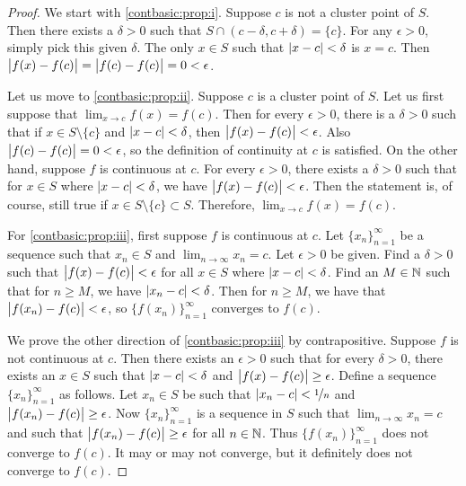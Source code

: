 \begin{proof}
\pagebreak[2]
We start with \ref{contbasic:prop:i}.  Suppose $c$ is not a cluster point of
$S$.  Then there exists a $\delta > 0$
such that $S \cap (c-\delta,c+\delta) = \{ c \}$.
For any $\epsilon > 0$, simply pick this given $\delta$.
The only $x \in S$ such that $\lvert {x-c} \rvert < \delta$ is $x=c$.  Then
$\bigl\lvert {f(x)-f(c)} \bigr\rvert = \bigl\lvert {f(c)-f(c)} \bigr\rvert = 0 < \epsilon$.

Let us move to \ref{contbasic:prop:ii}.
Suppose $c$ is a cluster point of $S$.  Let us first suppose
that $\lim_{x\to c} f(x) = f(c)$.  Then for every $\epsilon > 0$,
there is a $\delta > 0$ such that if $x \in S \setminus \{ c \}$
and $\lvert {x-c} \rvert < \delta$, then $\bigl\lvert {f(x)-f(c)} \bigr\rvert < \epsilon$.
Also $\bigl\lvert {f(c)-f(c)} \bigr\rvert = 0 < \epsilon$, so the definition of continuity at
$c$ is satisfied.  On the other hand, suppose $f$ is continuous
at $c$.  For every $\epsilon > 0$, there exists a $\delta > 0$
such that for $x \in S$ where $\lvert {x-c} \rvert < \delta$, we have
$\bigl\lvert {f(x)-f(c)} \bigr\rvert < \epsilon$.  Then the statement is, of course, still true if
$x \in S \setminus \{ c \} \subset S$.  Therefore, $\lim_{x\to c} f(x) =
f(c)$.

For \ref{contbasic:prop:iii}, first suppose $f$ is continuous at $c$.
Let $\{ x_n \}_{n=1}^\infty$
be a sequence such that $x_n \in S$ and $\lim_{n\to\infty} x_n = c$.  Let $\epsilon > 0$
be given.  Find a $\delta > 0$ such that $\bigl\lvert {f(x)-f(c)} \bigr\rvert < \epsilon$
for all $x \in S$ where $\lvert {x-c} \rvert < \delta$.  Find an $M \in {\mathbb{N}}$
such that for $n \geq M$, we have $\lvert {x_n-c} \rvert < \delta$.  Then for
$n \geq M$, we have that $\bigl\lvert {f(x_n)-f(c)} \bigr\rvert < \epsilon$,
so $\bigl\{ f(x_n) \bigr\}_{n=1}^\infty$
converges to $f(c)$.

We prove the other direction of \ref{contbasic:prop:iii} by contrapositive.
Suppose $f$ is not
continuous at $c$.  Then there exists an $\epsilon > 0$
such that for every $\delta > 0$, there exists an $x \in S$
such that $\lvert {x-c} \rvert < \delta$ and $\bigl\lvert {f(x)-f(c)} \bigr\rvert \geq \epsilon$.
Define a sequence $\{ x_n \}_{n=1}^\infty$ as follows.
Let $x_n \in S$ be such that $\lvert {x_n-c} \rvert < \nicefrac{1}{n}$
and $\bigl\lvert {f(x_n)-f(c)} \bigr\rvert \geq \epsilon$.
Now $\{ x_n \}_{n=1}^\infty$ is
a sequence in $S$ such that
$\lim_{n\to\infty} x_n = c$ and such that
$\bigl\lvert {f(x_n)-f(c)} \bigr\rvert \geq \epsilon$ for all $n \in {\mathbb{N}}$.
Thus $\bigl\{ f(x_n) \bigr\}_{n=1}^\infty$
does not converge to $f(c)$.  It may or may not converge, but it definitely
does not converge to $f(c)$.  
\end{proof}

